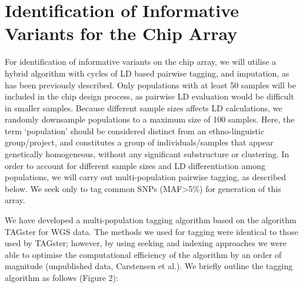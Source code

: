 \section{Identification of Informative Variants for the Chip Array}

For identification of informative variants on the chip array, we will utilise a hybrid algorithm with cycles of LD based pairwise tagging, and imputation, as has been previously described.\cite{Hoffmann2011422} Only populations with at least 50 samples will be included in the chip design process, as pairwise LD evaluation would be difficult in smaller samples. Because different sample sizes affects LD calculations,\cite{Jorde2000}\cite{Peer2006} we randomly downsample populations to a maximum size of 100 samples. Here, the term ‘population’ should be considered distinct from an ethno-linguistic group/project, and constitutes a group of individuals/samples that appear genetically homogeneous, without any significant substructure or clustering. In order to account for different sample sizes and LD differentiation among populations, we will carry out multi-population pairwise tagging, as described below. We seek only to tag common SNPs (MAF\textgreater5\%) for generation of this array.

We have developed a multi-population tagging algorithm based on the algorithm TAGster for WGS data.\cite{Xu2007} The methods we used for tagging were identical to those used by TAGster; however, by using seeking and indexing approaches we were able to optimise the computational efficiency of the algorithm by an order of magnitude (unpublished data, Carstensen et al.). We briefly outline the tagging algorithm as follows (Figure 2):

